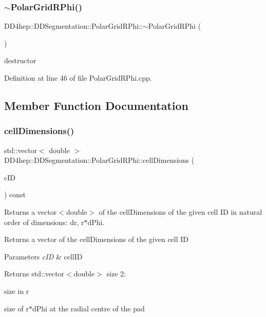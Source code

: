 \subsubsection{\texorpdfstring{$\sim$\+Polar\+Grid\+R\+Phi()}{~PolarGridRPhi()}}
{\footnotesize\ttfamily D\+D4hep\+::\+D\+D\+Segmentation\+::\+Polar\+Grid\+R\+Phi\+::$\sim$\+Polar\+Grid\+R\+Phi (\begin{DoxyParamCaption}{ }\end{DoxyParamCaption})\hspace{0.3cm}{\ttfamily [virtual]}}



destructor 



Definition at line 46 of file Polar\+Grid\+R\+Phi.\+cpp.



\subsection{Member Function Documentation}
\hypertarget{class_d_d4hep_1_1_d_d_segmentation_1_1_polar_grid_r_phi_a4d5962baf2ea8024e0b3c4f0b8d1185e}{}\label{class_d_d4hep_1_1_d_d_segmentation_1_1_polar_grid_r_phi_a4d5962baf2ea8024e0b3c4f0b8d1185e} 
\subsubsection{\texorpdfstring{cell\+Dimensions()}{cellDimensions()}}
{\footnotesize\ttfamily std\+::vector$<$ double $>$ D\+D4hep\+::\+D\+D\+Segmentation\+::\+Polar\+Grid\+R\+Phi\+::cell\+Dimensions (\begin{DoxyParamCaption}\item[{const \hyperlink{namespace_d_d4hep_1_1_d_d_segmentation_ac7af071d85cb48820914434a07e21ba1}{Cell\+ID} \&}]{c\+ID }\end{DoxyParamCaption}) const\hspace{0.3cm}{\ttfamily [virtual]}}



Returns a vector$<$double$>$ of the cell\+Dimensions of the given cell ID in natural order of dimensions\+: dr, r$\ast$d\+Phi. 

Returns a vector of the cell\+Dimensions of the given cell ID 
\begin{DoxyParams}{Parameters}
{\em c\+ID} & cell\+ID \\
\hline
\end{DoxyParams}
\begin{DoxyReturn}{Returns}
std\+::vector$<$double$>$ size 2\+:
\begin{DoxyEnumerate}
\item size in r
\item size of r$\ast$d\+Phi at the radial centre of the pad 
\end{DoxyEnumerate}
\end{DoxyReturn}



